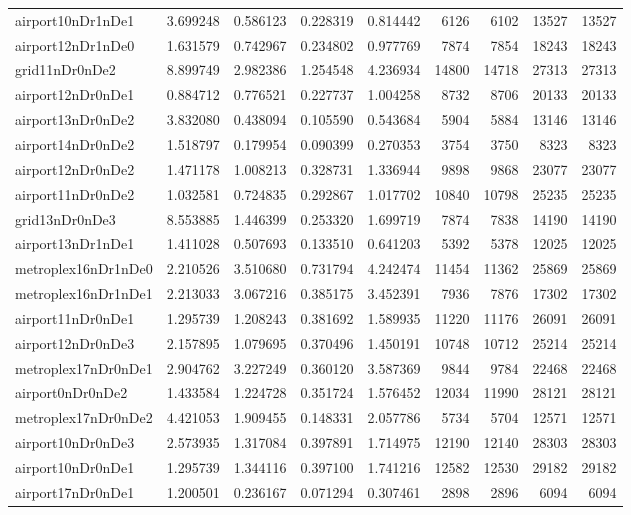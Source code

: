 \begin{longtable}{|l|r|r|r|r|r|r|r|r|}
airport10nDr1nDe1 & 3.699248 & 0.586123 & 0.228319 & 0.814442 & 6126 & 6102 & 13527 & 13527 \\
airport12nDr1nDe0 & 1.631579 & 0.742967 & 0.234802 & 0.977769 & 7874 & 7854 & 18243 & 18243 \\
grid11nDr0nDe2 & 8.899749 & 2.982386 & 1.254548 & 4.236934 & 14800 & 14718 & 27313 & 27313 \\
airport12nDr0nDe1 & 0.884712 & 0.776521 & 0.227737 & 1.004258 & 8732 & 8706 & 20133 & 20133 \\
airport13nDr0nDe2 & 3.832080 & 0.438094 & 0.105590 & 0.543684 & 5904 & 5884 & 13146 & 13146 \\
airport14nDr0nDe2 & 1.518797 & 0.179954 & 0.090399 & 0.270353 & 3754 & 3750 & 8323 & 8323 \\
airport12nDr0nDe2 & 1.471178 & 1.008213 & 0.328731 & 1.336944 & 9898 & 9868 & 23077 & 23077 \\
airport11nDr0nDe2 & 1.032581 & 0.724835 & 0.292867 & 1.017702 & 10840 & 10798 & 25235 & 25235 \\
grid13nDr0nDe3 & 8.553885 & 1.446399 & 0.253320 & 1.699719 & 7874 & 7838 & 14190 & 14190 \\
airport13nDr1nDe1 & 1.411028 & 0.507693 & 0.133510 & 0.641203 & 5392 & 5378 & 12025 & 12025 \\
metroplex16nDr1nDe0 & 2.210526 & 3.510680 & 0.731794 & 4.242474 & 11454 & 11362 & 25869 & 25869 \\
metroplex16nDr1nDe1 & 2.213033 & 3.067216 & 0.385175 & 3.452391 & 7936 & 7876 & 17302 & 17302 \\
airport11nDr0nDe1 & 1.295739 & 1.208243 & 0.381692 & 1.589935 & 11220 & 11176 & 26091 & 26091 \\
airport12nDr0nDe3 & 2.157895 & 1.079695 & 0.370496 & 1.450191 & 10748 & 10712 & 25214 & 25214 \\
metroplex17nDr0nDe1 & 2.904762 & 3.227249 & 0.360120 & 3.587369 & 9844 & 9784 & 22468 & 22468 \\
airport0nDr0nDe2 & 1.433584 & 1.224728 & 0.351724 & 1.576452 & 12034 & 11990 & 28121 & 28121 \\
metroplex17nDr0nDe2 & 4.421053 & 1.909455 & 0.148331 & 2.057786 & 5734 & 5704 & 12571 & 12571 \\
airport10nDr0nDe3 & 2.573935 & 1.317084 & 0.397891 & 1.714975 & 12190 & 12140 & 28303 & 28303 \\
airport10nDr0nDe1 & 1.295739 & 1.344116 & 0.397100 & 1.741216 & 12582 & 12530 & 29182 & 29182 \\
airport17nDr0nDe1 & 1.200501 & 0.236167 & 0.071294 & 0.307461 & 2898 & 2896 & 6094 & 6094 \\

\end{longtable}
